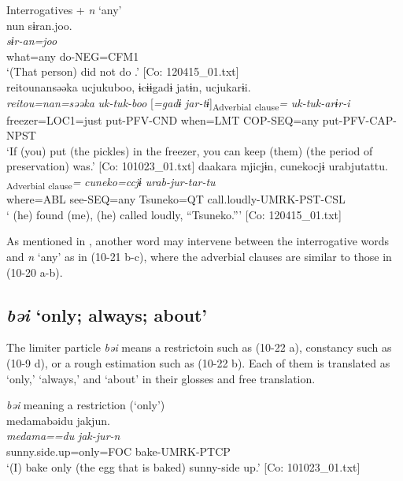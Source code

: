 \ea\label{ex:10.21}   Interrogatives + \textit{n} ‘any’\\
  \ea  %
      \glll    nun  sɨran.joo.\\
      \textit{}  \textit{sɨr-an=joo}\\
      what=any  do-NEG=CFM1\\
      \glt       ‘(That person) did not do .’ [Co: 120415\_01.txt]
  \ex\relax [= (8-44 a)]\\
      \glll    {\textbar}reitou{\textbar}nansəəka  ucjukuboo,  ɨcɨɨgadɨ  jatɨn,  ucjukarɨi.\\
      \textit{reitou=nan=səəka}  \textit{uk-tuk-boo}  [\textit{=gadɨ}  \textit{jar-tɨ}]\textsubscript{Adverbial} \textsubscript{clause}\textit{=} \textit{uk-tuk-arɨr-i}\\
      freezer=LOC1=just  put-PFV-CND  when=LMT  COP-SEQ=any  put-PFV-CAP-NPST\\
      \glt       ‘If (you) put (the pickles) in the freezer, you can keep (them)  (the period of preservation) was.’ [Co: 101023\_01.txt]
  \ex  %
      \glll    daakara  mjicjɨn,  cunekocjɨ  urabjutattu.\\
      [\textit{\Highlight{daa}=kara}  \textit{mj-tɨ}]\textsubscript{Adverbial clause}\textit{=}  \textit{cuneko=ccjɨ}  \textit{urab-jur-tar-tu}\\
      where=ABL  see-SEQ=any  Tsuneko=QT  call.loudly-UMRK-PST-CSL\\
      \glt       ‘ (he) found (me), (he) called loudly, “Tsuneko.”’ [Co: 120415\_01.txt]
    \z
\z

As mentioned in , another word may intervene between the interrogative words and \textit{n} ‘any’ as in (10-21 b-c), where the adverbial clauses are similar to those in (10-20 a-b).

\subsection{\textit{bəi} ‘only; always; about’}\label{sec:10.1.4}

The limiter particle \textit{bəi} means a restrictoin such as (10-22 a), constancy such as (10-9 d), or a rough estimation such as (10-22 b). Each of them is translated as ‘only,’ ‘always,’ and ‘about’ in their glosses and free translation.

\ea\label{ex:10.22} 
 \ea\textit{bəi} meaning a restriction (‘only’)\\
      \glll    {\textbar}medama{\textbar}bəidu  jakjun.\\
      \textit{medama==du}  \textit{jak-jur-n}\\
      sunny.side.up=only=FOC  bake-UMRK-PTCP\\
      \glt       ‘(I) bake only (the egg that is baked) sunny-side up.’ [Co: 101023\_01.txt]

